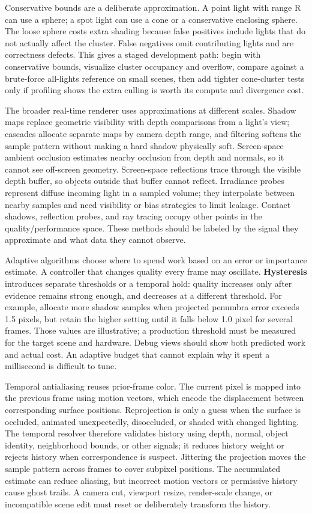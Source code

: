Conservative bounds are a deliberate approximation. A point light with range R can use a sphere; a spot light can use a cone or a conservative enclosing sphere. The loose sphere costs extra shading because false positives include lights that do not actually affect the cluster. False negatives omit contributing lights and are correctness defects. This gives a staged development path: begin with conservative bounds, visualize cluster occupancy and overflow, compare against a brute-force all-lights reference on small scenes, then add tighter cone-cluster tests only if profiling shows the extra culling is worth its compute and divergence cost.

The broader real-time renderer uses approximations at different scales. Shadow maps replace geometric visibility with depth comparisons from a light's view; cascades allocate separate maps by camera depth range, and filtering softens the sample pattern without making a hard shadow physically soft. Screen-space ambient occlusion estimates nearby occlusion from depth and normals, so it cannot see off-screen geometry. Screen-space reflections trace through the visible depth buffer, so objects outside that buffer cannot reflect. Irradiance probes represent diffuse incoming light in a sampled volume; they interpolate between nearby samples and need visibility or bias strategies to limit leakage. Contact shadows, reflection probes, and ray tracing occupy other points in the quality/performance space. These methods should be labeled by the signal they approximate and what data they cannot observe.

Adaptive algorithms choose where to spend work based on an error or importance estimate. A controller that changes quality every frame may oscillate. \textbf{Hysteresis} introduces separate thresholds or a temporal hold: quality increases only after evidence remains strong enough, and decreases at a different threshold. For example, allocate more shadow samples when projected penumbra error exceeds 1.5 pixels, but retain the higher setting until it falls below 1.0 pixel for several frames. Those values are illustrative; a production threshold must be measured for the target scene and hardware. Debug views should show both predicted work and actual cost. An adaptive budget that cannot explain why it spent a millisecond is difficult to tune.

Temporal antialiasing reuses prior-frame color. The current pixel is mapped into the previous frame using motion vectors, which encode the displacement between corresponding surface positions. Reprojection is only a guess when the surface is occluded, animated unexpectedly, disoccluded, or shaded with changed lighting. The temporal resolver therefore validates history using depth, normal, object identity, neighborhood bounds, or other signals; it reduces history weight or rejects history when correspondence is suspect. Jittering the projection moves the sample pattern across frames to cover subpixel positions. The accumulated estimate can reduce aliasing, but incorrect motion vectors or permissive history cause ghost trails. A camera cut, viewport resize, render-scale change, or incompatible scene edit must reset or deliberately transform the history.


